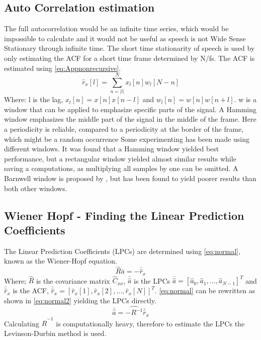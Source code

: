 \subsection{Auto Correlation estimation}
The full autocorrelation would be an infinite time series, which would be impossible to calculate and it would not be useful as speech is not Wide Sense Stationary through infinite time. The short time stationarity of speech is used by only estimating the ACF for a short time frame determined by N/fs. The ACF is estimated using \autoref{eq:Appnonrecursive}.
\begin{equation}\label{eq:Appnonrecursive}
\hat{r}_x[l] = \sum^{N}_{n=\left| l\right|} x_l[n]w_l[N-n]
\end{equation}
Where: l is the lag, $x_l[n]=x[n]x[n-l]$ and $w_l[n]=w[n]w[n+l]$. w is a window that can be applied to emphasize specific parts of the signal. A Hamming window emphasizes the middle part of the signal in the middle of the frame. Here a periodicity is reliable, compared to a periodicity at the border of the frame, which might be a random occurrence Some experimenting has been made using different windows. It was found that a Hamming window yielded best performance, but a rectangular window yielded almost similar results while saving a computations, as multiplying all samples by one can be omitted. A Barnwell window is proposed by \cite{Speech}, but has been found to yield poorer results than both other windows.   

\subsection{ Wiener Hopf - Finding the Linear Prediction Coefficients}
 The Linear Prediction Coefficients (LPCs) are determined using \autoref{eq:normal}, known as the Wiener-Hopf equation.
\begin{equation}\label{eq:normal}
\hat{R}  \bar{a} = -\bar{\hat{r}}_x
\end{equation}
Where; $\hat{R}$ is the covariance matrix $\hat{C}_{xx}$, $\bar{\hat{a}}$ is the LPCs $\bar{\hat{a}} = [\hat{a}_0 , \hat{a}_1, \dotsc, \hat{a}_{N-1}]^T$ and $\bar{\hat{r}}_x$ is the ACF, $\bar{\hat{r}}_x = [\hat{r}_x[1] , \hat{r}_x[2], \dotsc, \hat{r}_x[N]]^T$. \autoref{eq:normal} can be rewritten as shown in \autoref{eq:normal2} yielding the LPCs directly.  
\begin{equation}\label{eq:normal2}
\bar{\hat{a}} = \hat{-R^{-1}} \bar{\hat{r}}_x
\end{equation}
Calculating $\hat{R}^{-1}$ is computationally heavy, therefore to estimate the LPCs the Levinson-Durbin method is used. 

